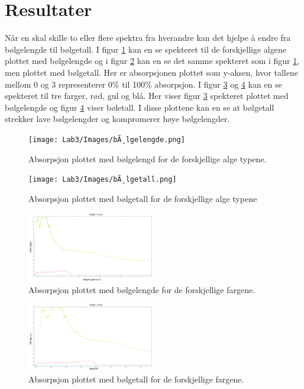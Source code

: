 \documentclass[twocolumn, 11pt]{article} %
\begin{document}
\section{Resultater}

Når en skal skille to eller flere spektra fra hverandre kan det hjelpe å endre fra bølgelengde til bølgetall. I figur \ref{alger_lengde} kan en se spekteret til de forskjellige algene plottet med bølgelengde og i figur \ref{alger_tall} kan en se 
det samme spekteret som i figur \ref{alger_lengde}, men plottet med bølgetall.  Her er absorpsjonen plottet som y-aksen, hvor tallene mellom 0 og 3 representerer 0\% til 100\% absorpsjon. I figur \ref{farge_lengde} og \ref{farge_tall} kan en se spekteret til tre farger, rød, gul og blå. Her viser figur \ref{farge_lengde} spekteret plottet med bølgelengde og figur \ref{farge_tall} viser bøletall. I disse plottene kan en se at bølgetall strekker lave bølgelengder og kompromerer høye bølgelengder.

 
\begin{figure}[H]
\texttt{[image: Lab3/Images/bÃ¸lgelengde.png]}
\caption{Absorpsjon plottet med bølgelengd for de forskjellige alge typene.}
\label{alger_lengde}
\end{figure}

\begin{figure}[H]
\texttt{[image: Lab3/Images/bÃ¸lgetall.png]}
\caption{Absorpsjon plottet med bølgetall for de forskjellige alge typene}
\label{alger_tall}
\end{figure}

\begin{figure}[H]
\includegraphics[width=0.5\textwidth]{Lab3/Images/sirupVSlengde.png}
\caption{Absorpsjon plottet med bølgelengde for de forskjellige fargene.}
\label{farge_lengde}
\end{figure}

\begin{figure}[H]
\includegraphics[width=0.5\textwidth]{Lab3/Images/sirupVStall.png}
\caption{Absorpsjon plottet med bølgetall for de forskjellige fargene.}
\label{farge_tall}
\end{figure}
\end{document}
